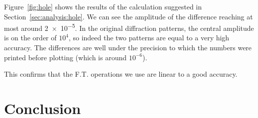 \documentclass[11pt]{article}
\begin{document}
Figure~\ref{fig:hole} shows the results of the calculation suggested in Section~\ref{sec:analysis:hole}. We can see the amplitude of the difference reaching at most around \num{2e-5}. In the original diffraction patterns, the central amplitude is on the order of $10^4$, so indeed the two patterns are equal to a very high accuracy. The differences are well under the precision to which the numbers were printed before plotting (which is around $10^{-6}$).

This confirms that the F.T. operations we use are linear to a good accuracy.

\section{Conclusion}\label{sec:conclusion}

\printbibliography{}
\end{document}
